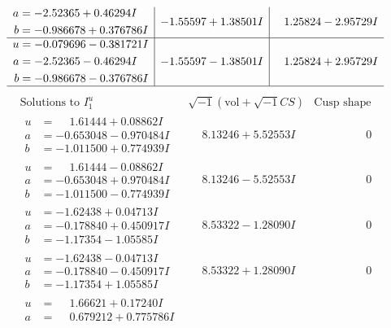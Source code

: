 \documentclass[1p]{elsarticle_modified}
\theoremstyle{definition}
\newcommand{\I}{\sqrt{-1}}
\begin{document}
$$\begin{array}{c|c|c}
\begin{aligned}
a &= -2.52365 + 0.46294 I \\
b &= -0.986678 + 0.376786 I\end{aligned}
 & -1.55597 + 1.38501 I & \phantom{-}1.25824 - 2.95729 I \\ \hline\begin{aligned}
u &= -0.079696 - 0.381721 I \\
a &= -2.52365 - 0.46294 I \\
b &= -0.986678 - 0.376786 I\end{aligned}
 & -1.55597 - 1.38501 I & \phantom{-}1.25824 + 2.95729 I\\
 \hline 
 \end{array}$$\newpage$$\begin{array}{c|c|c}  
\text{Solutions to }I^u_{1}& \I (\text{vol} + \sqrt{-1}CS) & \text{Cusp shape}\\
 \hline 
\begin{aligned}
u &= \phantom{-}1.61444 + 0.08862 I \\
a &= -0.653048 - 0.970484 I \\
b &= -1.011500 + 0.774939 I\end{aligned}
 & \phantom{-}8.13246 + 5.52553 I & \phantom{-0.000000 } 0 \\ \hline\begin{aligned}
u &= \phantom{-}1.61444 - 0.08862 I \\
a &= -0.653048 + 0.970484 I \\
b &= -1.011500 - 0.774939 I\end{aligned}
 & \phantom{-}8.13246 - 5.52553 I & \phantom{-0.000000 } 0 \\ \hline\begin{aligned}
u &= -1.62438 + 0.04713 I \\
a &= -0.178840 + 0.450917 I \\
b &= -1.17354 - 1.05585 I\end{aligned}
 & \phantom{-}8.53322 - 1.28090 I & \phantom{-0.000000 } 0 \\ \hline\begin{aligned}
u &= -1.62438 - 0.04713 I \\
a &= -0.178840 - 0.450917 I \\
b &= -1.17354 + 1.05585 I\end{aligned}
 & \phantom{-}8.53322 + 1.28090 I & \phantom{-0.000000 } 0 \\ \hline\begin{aligned}
u &= \phantom{-}1.66621 + 0.17240 I \\
a &= \phantom{-}0.679212 + 0.775786 I \\

\end{aligned}
\end{array}$$
\end{document}
